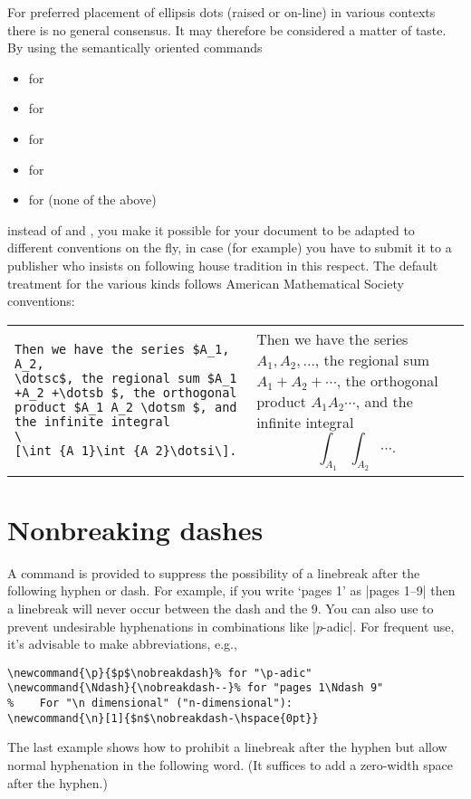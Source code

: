 \documentclass[leqno,titlepage,openany]{amsldoc}[1999/12/13]
\begin{document}
For preferred placement of ellipsis dots (raised or on-line) in various
contexts there is no general consensus. It may therefore be considered a
matter of taste. By using the semantically oriented commands
\begin{itemize}
\item {} for 
\item {} for 
\item {} for 
\item {} for 
\item {} for  (none of the above)
\end{itemize}
instead of  and , you make it possible for your
document to be adapted to different conventions on the fly, in case (for
example) you have to submit it to a publisher who insists on following
house tradition in this respect. The default treatment for the various
kinds follows American Mathematical Society conventions:
\begin{center}
\begin{tabular}{@{}l@{}l@{}}
\begin{minipage}[t]{.54\textwidth}
\begin{verbatim}
Then we have the series $A_1, A_2,
\dotsc$, the regional sum $A_1
+A_2 +\dotsb $, the orthogonal
product $A_1 A_2 \dotsm $, and
the infinite integral
\[\int_{A_1}\int_{A_2}\dotsi\].
\end{verbatim}
\end{minipage}
&
\begin{minipage}[t]{.45\textwidth}
\noindent
Then we have the series $A_1,A_2,\dotsc$,
the regional sum $A_1+A_2+\dotsb$,
the orthogonal product $A_1A_2\dotsm$,
and the infinite integral
\[\int_{A_1}\int_{A_2}\dotsi.\]
\end{minipage}
\end{tabular}
\end{center}

\section{Nonbreaking dashes}

A command  is provided to suppress the possibility
of a linebreak after the following hyphen or dash. For example, if you
write `pages 1' as |pages 1\nobreakdash--9| then a linebreak will
never occur between the dash and the 9. You can also use
 to prevent undesirable hyphenations in combinations
like |$p$-adic|. For frequent use, it's advisable to make abbreviations,
e.g.,
\begin{verbatim}
\newcommand{\p}{$p$\nobreakdash}% for "\p-adic"
\newcommand{\Ndash}{\nobreakdash--}% for "pages 1\Ndash 9"
%    For "\n dimensional" ("n-dimensional"):
\newcommand{\n}[1]{$n$\nobreakdash-\hspace{0pt}}
\end{verbatim}
The last example shows how to prohibit a linebreak after the hyphen but
allow normal hyphenation in the following word. (It suffices to add a
zero-width space after the hyphen.)
\end{document}
